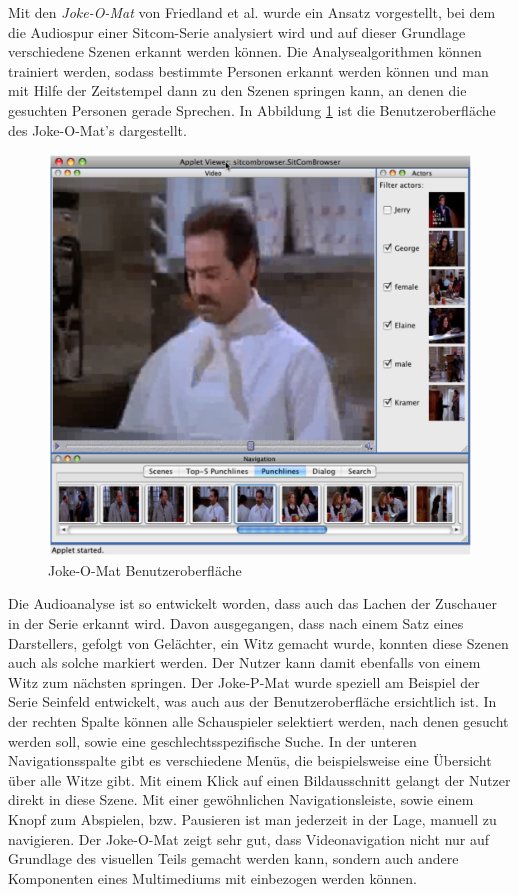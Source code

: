 \documentclass[11pt,a4paper]{report}
\begin{document}
Mit den  \emph{Joke-O-Mat} von Friedland et al. \cite{friedland2009joke} wurde ein Ansatz vorgestellt, bei dem die Audiospur einer Sitcom-Serie analysiert wird und auf dieser Grundlage verschiedene Szenen erkannt werden können. Die Analysealgorithmen können trainiert werden, sodass bestimmte Personen erkannt werden können und man mit Hilfe der Zeitstempel dann zu den Szenen springen kann, an denen die gesuchten Personen gerade Sprechen. In Abbildung \ref{jokeomat} ist die Benutzeroberfläche des Joke-O-Mat's dargestellt.
\begin{figure}[h]
\begin{center}
\includegraphics[scale=0.4]{./images/39.png}
\caption{Joke-O-Mat Benutzeroberfläche \cite{friedland2009joke}}
\label{jokeomat}
\end{center}
\end{figure}
Die Audioanalyse ist so entwickelt worden, dass auch das Lachen der Zuschauer in der Serie erkannt wird. Davon ausgegangen, dass nach einem Satz eines Darstellers, gefolgt von Gelächter, ein Witz gemacht wurde, konnten diese Szenen auch als solche markiert werden. Der Nutzer kann damit ebenfalls von einem Witz zum nächsten springen. Der Joke-P-Mat wurde speziell am Beispiel der Serie Seinfeld entwickelt, was auch aus der Benutzeroberfläche ersichtlich ist. In der rechten Spalte können alle Schauspieler selektiert werden, nach denen gesucht werden soll, sowie eine geschlechtsspezifische Suche. In der unteren Navigationsspalte gibt es verschiedene Menüs, die beispielsweise eine Übersicht über alle Witze gibt. Mit einem Klick auf einen Bildausschnitt gelangt der Nutzer direkt in diese Szene. Mit einer gewöhnlichen Navigationsleiste, sowie einem Knopf zum Abspielen, bzw. Pausieren ist man jederzeit in der Lage, manuell zu navigieren.
Der Joke-O-Mat zeigt sehr gut, dass Videonavigation nicht nur auf Grundlage des visuellen Teils gemacht werden kann, sondern auch andere Komponenten eines Multimediums mit einbezogen werden können.
\end{document}
